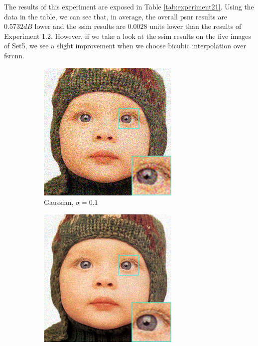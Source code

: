 The results of this experiment are exposed in Table \ref{tab:experiment21}. Using the data in the table, we can see that, in average, the overall \gls{psnr} results are $0.5732dB$ lower and the \gls{ssim} results are $0.0028$ units lower than the results of Experiment 1.2. However, if we take a look at the \gls{ssim} results on the five images of Set5, we see a slight improvement when we choose bicubic interpolation over \gls{fsrcnn}.

\begin{figure}
	\centering
	\begin{subfigure}{0.24\textwidth}
		\includegraphics[width=\textwidth]{images/exp2.1/gaussian0.png}
		\caption{Gaussian, $\sigma=0.1$}
	\end{subfigure}
	\begin{subfigure}{0.24\textwidth}
		\includegraphics[width=\textwidth]{images/exp2.1/poisson0.png}

\end{subfigure}
\end{figure}
